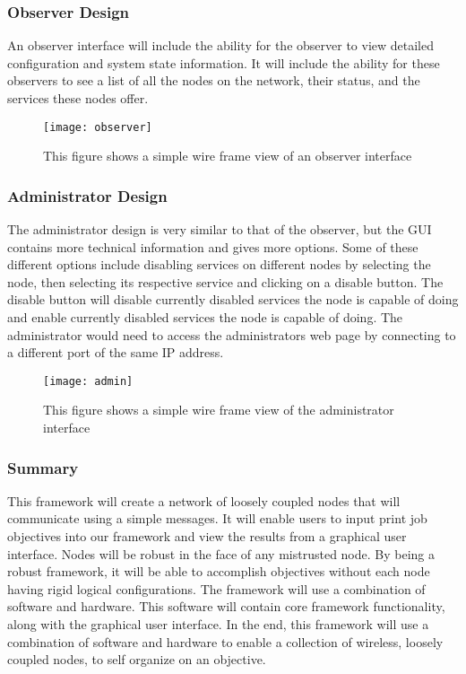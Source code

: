 \subsubsection{Observer Design}
An observer interface will include the ability for the observer to view detailed configuration and system state information. It will include the ability for these observers to see a list of all the nodes on the network, their status, and the services these nodes offer.
\begin{figure}[H]
\centering
\texttt{[image: observer]}
\captionsetup{justification=centering}
\caption{This figure shows a simple wire frame view of an observer interface}
\end{figure}


\subsubsection{Administrator Design}
The administrator design is very similar to that of the observer, but the GUI contains more technical information and gives more options. Some of these different options include disabling services on different nodes by selecting the node, then selecting its respective service and clicking on a disable button. The disable button will disable currently disabled services the node is capable of doing and enable currently disabled services the node is capable of doing. 
The administrator would need to access the administrators web page by connecting to a different port of the same IP address.  
\begin{figure}[H]
\centering
\texttt{[image: admin]}
\captionsetup{justification=centering}
\caption{This figure shows a simple wire frame view of the administrator interface}
\end{figure}




\subsubsection{Summary}
This framework will create a network of loosely coupled nodes that will communicate using a simple messages. It will enable users to input print job objectives into our framework and view the results from a graphical user interface. Nodes will be robust in the face of any mistrusted node. By being a robust framework, it will be able to accomplish objectives without each node having rigid logical configurations. The framework will use a combination of software and hardware. This software will contain core framework functionality, along with the graphical user interface. In the end, this framework will use a combination of software and hardware to enable a collection of wireless, loosely coupled nodes, to self organize on an objective.


